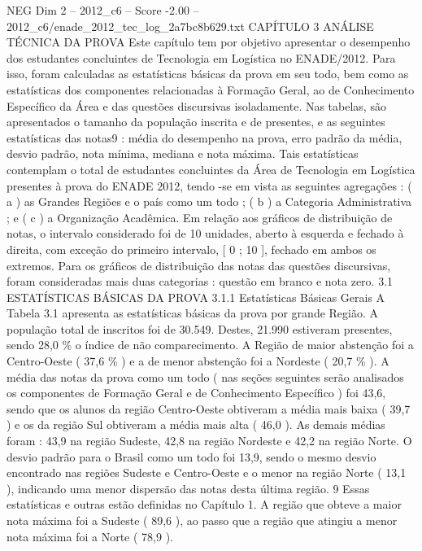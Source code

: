 \begin{textsample}{NEG Dim 2 – 2012\_c6 – Score -2.00 – 2012\_c6/enade\_2012\_tec\_log\_2a7bc8b629.txt}  \label{ex:f2_neg_182}
CAPÍTULO 3 ANÁLISE TÉCNICA DA PROVA Este capítulo tem por objetivo apresentar o desempenho dos estudantes concluintes de Tecnologia em Logística no ENADE/2012.
Para isso, foram calculadas as estatísticas básicas da prova em seu todo, bem como as estatísticas dos componentes relacionadas à Formação Geral, ao de Conhecimento Específico da Área e das questões discursivas isoladamente.
Nas tabelas, são apresentados o tamanho da população inscrita e de presentes, e as seguintes estatísticas das notas9 : média do desempenho na prova, erro padrão da média, desvio padrão, nota mínima, mediana e nota máxima.
Tais estatísticas contemplam o total de estudantes concluintes da Área de Tecnologia em Logística presentes à prova do ENADE 2012, tendo -se em vista as seguintes agregações : ( a ) as Grandes Regiões e o país como um todo ; ( b ) a Categoria Administrativa ; e ( c ) a Organização Acadêmica.
Em relação aos gráficos de distribuição de notas, o intervalo considerado foi de 10 unidades, aberto à esquerda e fechado à direita, com exceção do primeiro intervalo, [ 0 ; 10 ], fechado em ambos os extremos.
Para os gráficos de distribuição das notas das questões discursivas, foram consideradas mais duas categorias : questão em branco e nota zero. 3.1 ESTATÍSTICAS BÁSICAS DA PROVA 3.1.1 Estatísticas Básicas Gerais A Tabela 3.1 apresenta as estatísticas básicas da prova por grande Região.
A população total de inscritos foi de 30.549.
Destes, 21.990 estiveram presentes, sendo 28,0 \% o índice de não comparecimento.
A Região de maior abstenção foi a Centro-Oeste ( 37,6 \% ) e a de menor abstenção foi a Nordeste ( 20,7 \% ).
A média das notas da prova como um todo ( nas seções seguintes serão analisados os componentes de Formação Geral e de Conhecimento Específico ) foi 43,6, sendo que os alunos da região Centro-Oeste obtiveram a média mais baixa ( 39,7 ) e os da região Sul obtiveram a média mais alta ( 46,0 ).
As demais médias foram : 43,9 na região Sudeste, 42,8 na região Nordeste e 42,2 na região Norte.
O desvio padrão para o Brasil como um todo foi 13,9, sendo o mesmo desvio encontrado nas regiões Sudeste e Centro-Oeste e o menor na região Norte ( 13,1 ), indicando uma menor dispersão das notas desta última região. 9 Essas estatísticas e outras estão definidas no Capítulo 1.
A região que obteve a maior nota máxima foi a Sudeste ( 89,6 ), ao passo que a região que atingiu a menor nota máxima foi a Norte ( 78,9 ).

\end{textsample}
